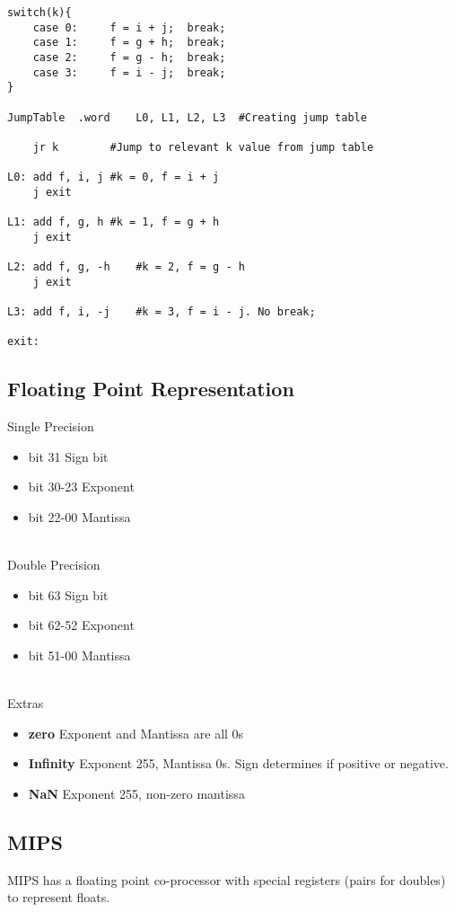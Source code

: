 \documentclass{article}
\newcommand\tab[1][0.5cm]{\hspace*{#1}}
\begin{document}
		\begin{lstlisting}
switch(k){
	case 0:		f = i + j;	break;
	case 1:		f = g + h;	break;
	case 2:		f = g - h;	break;
	case 3:		f = i - j;	break;
}

JumpTable  .word	L0, L1, L2, L3	#Creating jump table

	jr k		#Jump to relevant k value from jump table

L0:	add f, i, j	#k = 0, f = i + j
	j exit

L1:	add f, g, h	#k = 1, f = g + h
	j exit

L2:	add f, g, -h	#k = 2, f = g - h
	j exit

L3: add f, i, -j	#k = 3, f = i - j. No break;

exit:
		\end{lstlisting}

	\subsection*{Floating Point Representation}
		Single Precision
		\begin{itemize}
			\item bit 31 \tab \tab Sign bit
			\item bit 30-23 \tab Exponent
			\item bit 22-00 \tab Mantissa
		\end{itemize}
\\
		Double Precision
		\begin{itemize}
			\item bit 63 \tab \tab Sign bit
			\item bit 62-52 \tab Exponent
			\item bit 51-00 \tab Mantissa
		\end{itemize}
\\
		Extras
		\begin{itemize}
			\item \textbf{zero} \tab \tab Exponent and Mantissa are all 0s
			\item \textbf{Infinity} \tab Exponent 255, Mantissa 0s. Sign determines if positive or negative.
			\item \textbf{NaN} \tab \tab Exponent 255, non-zero mantissa
		\end{itemize}

	\subsection*{MIPS}
		MIPS has a floating point co-processor with special registers (pairs for doubles) to represent floats.\\
\end{document}
